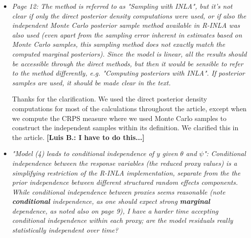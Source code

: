 \documentclass[11pt]{article}
\newcommand{\lb}[1]{\color{ForestGreen}\textbf{[Luis B.: #1]}\normalcolor}
\newcommand{\bl}[1]{\color{red}\textbf{[Bo: #1]}\normalcolor}
\begin{document}
\begin{itemize}
We are also aware that possibly there exists a high dependence of the results on the location and spacing of the knots as the
reviewer emphasizes, this is why we fixed the knots location based on the
degree of linear association between the true temperatures and the BSplines. In
addition, we know
that the knots spacing is a difficult problem to work with, mainly because of the
nature of the temperature series and its diverse spatial composition, this is
why we think that the assumption of a continuous time model is a complex and
ambitious assumption. We prefer our simpler and more conservative assumption of uniformity in the distribution of nodes.    
\bl{It sounds complicated, but the reviewer pointed the function in INLA to use,
  so we may try the ``rw2" model?}\lb{Yes, it is quite complicated mostly
  because the penalization term that the reviewer is suggesting. I prefer to defend our position here.}

\item \textit{Page 12: The method is referred to as "Sampling with INLA", but it's
  not clear if only the direct posterior density computations were
  used, or if also the independent Monte Carlo posterior sample method
  available in R-INLA was also used (even apart from the sampling
  error inherent in estimates based on Monte Carlo samples, this
  sampling method does not exactly match the computed marginal
  posteriors).  Since the model is linear, all the results should be
  accessible through the direct methods, but then it would be sensible
  to refer to the method differently, e.g. "Computing posteriors with
  INLA". If posterior samples are used, it should be made clear in the
  text.} 

Thanks for the clarification. We used the direct posterior density computations
for most of the calculations throughout the article, except when we compute the
CRPS measure where we used Monte Carlo samples to construct the independent
samples within its definition. We clarified this in the article. \lb{I have to do this...}  

\item \textit{"Model (4) leads to conditional independence of $y$ given $\theta$ and
  $\psi$": Conditional independence between the response variables (the
  reduced proxy values) is a simplifying restriction of the R-INLA
  implementation, separate from the the prior independence between
  different structured random effects components. While conditional
  independence between proxies seems reasonable (note \textbf{conditional}
  independence, as one should expect strong \textbf{marginal} dependence, as
  noted also on page 9), I have a harder time accepting conditional
  independence within each proxy; are the model residuals really
  statistically independent over time?}


\end{itemize}
\end{document}
